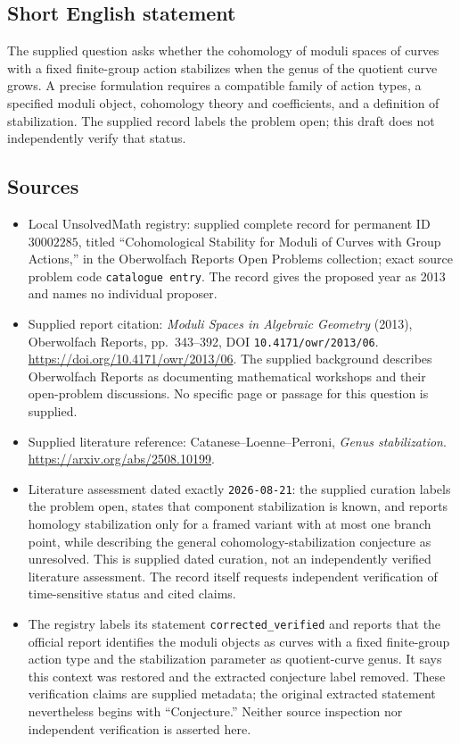 \documentclass[11pt]{article}
\begin{document}
\subsection{Short English statement}
The supplied question asks whether the cohomology of moduli spaces of curves with a fixed finite-group action stabilizes when the genus of the quotient curve grows. A precise formulation requires a compatible family of action types, a specified moduli object, cohomology theory and coefficients, and a definition of stabilization. The supplied record labels the problem open; this draft does not independently verify that status.
\subsection{Sources}
\begin{itemize}
\item Local UnsolvedMath registry: supplied complete record for permanent ID \(30002285\), titled ``Cohomological Stability for Moduli of Curves with Group Actions,'' in the Oberwolfach Reports Open Problems collection; exact source problem code \texttt{catalogue entry}. The record gives the proposed year as 2013 and names no individual proposer.
\item Supplied report citation: \emph{Moduli Spaces in Algebraic Geometry} (2013), Oberwolfach Reports, pp.\ 343--392, DOI \texttt{10.4171/owr/2013/06}. \url{https://doi.org/10.4171/owr/2013/06}. The supplied background describes Oberwolfach Reports as documenting mathematical workshops and their open-problem discussions. No specific page or passage for this question is supplied.
\item Supplied literature reference: Catanese--Loenne--Perroni, \emph{Genus stabilization}. \url{https://arxiv.org/abs/2508.10199}.
\item Literature assessment dated exactly \texttt{2026-08-21}: the supplied curation labels the problem open, states that component stabilization is known, and reports homology stabilization only for a framed variant with at most one branch point, while describing the general cohomology-stabilization conjecture as unresolved. This is supplied dated curation, not an independently verified literature assessment. The record itself requests independent verification of time-sensitive status and cited claims.
\item The registry labels its statement \texttt{corrected\_verified} and reports that the official report identifies the moduli objects as curves with a fixed finite-group action type and the stabilization parameter as quotient-curve genus. It says this context was restored and the extracted conjecture label removed. These verification claims are supplied metadata; the original extracted statement nevertheless begins with ``Conjecture.'' Neither source inspection nor independent verification is asserted here.
\end{itemize}
\end{document}
